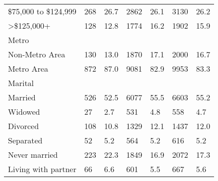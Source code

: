 \begin{longtable}{lllllll}
\$75,000 to \$124,999 & 268 & 26.7 & 2862 & 26.1 & 3130 & 26.2 \\ 
>\$125,000+ & 128 & 12.8 & 1774 & 16.2 & 1902 & 15.9 \\ 
\midrule
\multicolumn{1}{l}{Metro} \\ 
\midrule
Non-Metro Area & 130 & 13.0 & 1870 & 17.1 & 2000 & 16.7 \\ 
Metro Area & 872 & 87.0 & 9081 & 82.9 & 9953 & 83.3 \\ 
\midrule
\multicolumn{1}{l}{Marital} \\ 
\midrule
Married & 526 & 52.5 & 6077 & 55.5 & 6603 & 55.2 \\ 
Widowed & 27 & 2.7 & 531 & 4.8 & 558 & 4.7 \\ 
Divorced & 108 & 10.8 & 1329 & 12.1 & 1437 & 12.0 \\ 
Separated & 52 & 5.2 & 564 & 5.2 & 616 & 5.2 \\ 
Never married & 223 & 22.3 & 1849 & 16.9 & 2072 & 17.3 \\ 
Living with partner & 66 & 6.6 & 601 & 5.5 & 667 & 5.6 \\ 
 \bottomrule
\end{longtable}

